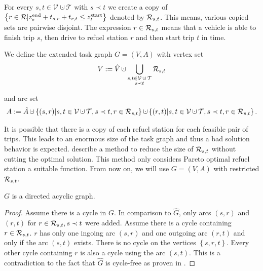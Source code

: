 \begin{definition}
\label{def:extended_taskgraph}

For every $s,t\in \mathcal{V}\cupdot\mathcal{T}$ with $s\prec t$ we create a copy of $\left\{r\in\mathcal{R}|z^{\operatorname{end}}_s+t_{s,r}+t_{r,t}\leq z^{\operatorname{start}}_t\right\}$ denoted by $\mathcal{R}_{s,t}$. This means, various copied sets are pairwise disjoint. The expression $r\in\mathcal{R}_{s,t}$ means that a vehicle is able to finish trip $s$, then drive to refuel station $r$ and then start trip $t$ in time.

We define the extended task graph $G=(V,A)$ with vertex set
\begin{align*}
	V:=\hat{V}\cupdot\Cupdot_{\substack{s,t\in\mathcal{V}\cupdot\mathcal{T} \\ s\prec t}} \Rst
\end{align*}

and arc set
\begin{align*}
	A:=\hat{A}\cupdot\left\{(s,r)|s,t\in\mathcal{V}\cupdot\mathcal{T},s\prec t,r\in\Rst\right\}\cupdot\left\{(r,t)|s,t\in\mathcal{V}\cupdot\mathcal{T},s\prec t,r\in\Rst\right\}.
\end{align*}

It is possible that there is a copy of each refuel station for each feasible pair of trips. This leads to an enormous size of the task graph and thus a bad solution behavior is expected. \cite[pp. 24-30]{Kaiser_Knoll} describe a method to reduce the size of $\mathcal{R}_{s,t}$ without cutting the optimal solution. This method only considers Pareto optimal refuel station \wrt a suitable function. From now on, we will use $G=(V,A)$ with restricted $\mathcal{R}_{s,t}$.

\end{definition}

\begin{lemma}

$G$ is a directed acyclic graph.

\end{lemma}

\begin{proof}

Assume there is a cycle in $G$. In comparison to $\hat{G}$, only arcs $(s,r)$ and $(r,t)$ for ${r\in\mathcal{R}_{s,t}, s\prec t}$ were added. Assume there is a cycle containing $r\in\mathcal{R}_{s,t}$. $r$ has only one ingoing arc $(s,r)$ and one outgoing arc $(r,t)$ and only if the arc $(s,t)$ exists. There is no cycle on the vertices $\left\{s,r,t\right\}$. Every other cycle containing $r$ is also a cycle using the arc $(s,t)$. This is a contradiction to the fact that $\hat{G}$ is cycle-free as proven in .

\end{proof}

